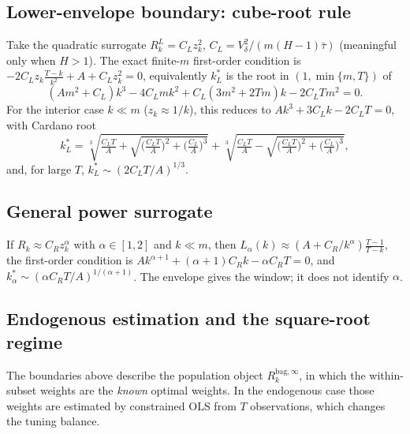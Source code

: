 \documentclass[11pt]{article}
\newcommand{\Rbag}{R_k^{\mathrm{bag},\infty}}
\begin{document}
\subsection{Lower-envelope boundary: cube-root rule}
Take the quadratic surrogate $R_k^L=C_Lz_k^2$, $C_L=V_\delta^2/(m(H-1)\bar\tau)$ (meaningful
only when $H>1$). The exact finite-$m$ first-order condition is
$-2C_Lz_k\frac{T-k}{k^2}+A+C_Lz_k^2=0$, equivalently $k_L^\ast$ is the root in
$(1,\min\{m,T\})$ of
\[
  (Am^2+C_L)k^3-4C_Lmk^2+C_L(3m^2+2Tm)k-2C_LTm^2=0 .
\]
For the interior case $k\ll m$ ($z_k\approx1/k$), this reduces to $Ak^3+3C_Lk-2C_LT=0$, with
Cardano root
\[
  k_L^\ast=\sqrt[3]{\tfrac{C_LT}{A}+\sqrt{\big(\tfrac{C_LT}{A}\big)^2+\big(\tfrac{C_L}{A}\big)^3}}
  +\sqrt[3]{\tfrac{C_LT}{A}-\sqrt{\big(\tfrac{C_LT}{A}\big)^2+\big(\tfrac{C_L}{A}\big)^3}},
\]
and, for large $T$, $k_L^\ast\sim(2C_LT/A)^{1/3}$.

\subsection{General power surrogate}
If $R_k\approx C_Rz_k^\alpha$ with $\alpha\in[1,2]$ and $k\ll m$, then $L_\alpha(k)\approx
(A+C_R/k^\alpha)\frac{T-1}{T-k}$, the first-order condition is $Ak^{\alpha+1}+(\alpha+1)C_Rk-
\alpha C_RT=0$, and $k_\alpha^\ast\sim(\alpha C_RT/A)^{1/(\alpha+1)}$. The envelope gives the
window; it does not identify $\alpha$.

\subsection{Endogenous estimation and the square-root regime}\label{sec:endo}
The boundaries above describe the population object $\Rbag$, in which the within-subset
weights are the \emph{known} optimal weights. In the endogenous case those weights are
estimated by constrained OLS from $T$ observations, which changes the tuning balance.
\end{document}

